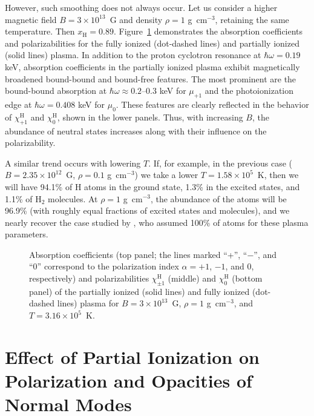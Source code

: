 \documentclass{emulateapj}
\newcommand{\gcc}{\mbox{g cm$^{-3}$}}
\newcommand{\chiH}{\chi^\mathrm{H}}
\newcommand{\xH}{x_\mathrm{H}}
\begin{document}
However, such smoothing does not always occur. Let us consider a higher 
magnetic field $B=3\times10^{13}$~G and density $\rho=1$ \gcc,
retaining the same temperature. Then $\xH=0.89$.
Figure~\ref{fig:kk13a4} demonstrates
the absorption coefficients and polarizabilities for the
fully ionized (dot-dashed lines) and partially ionized
(solid lines) plasma. In addition to the proton cyclotron 
resonance at $\hbar\omega=0.19$ keV,
absorption coefficients in the partially ionized plasma
exhibit magnetically broadened bound-bound
and bound-free features. The most prominent are the bound-bound
absorption at $\hbar\omega\approx0.2$--0.3 keV for $\mu_{+1}$
and the photoionization edge at $\hbar\omega=0.408$ keV for $\mu_0$.
These features are clearly reflected in the behavior of $\chiH_{+1}$
and $\chiH_0$, shown in the lower panels. Thus, with increasing $B$,
the abundance of neutral states increases along with their influence
on the polarizability.

A similar trend occurs with lowering $T$. If, for example,
in the previous case ($B=2.35\times10^{12}$~G, $\rho=0.1$ \gcc)
we take a lower $T=1.58\times10^5$~K, then we will have 
94.1\% of H atoms in the ground state, 1.3\% in the excited states,
and 1.1\% of H$_2$ molecules. At $\rho=1$ \gcc,
the abundance of the atoms will be 96.9\% (with roughly equal
fractions of excited states and molecules), and we
nearly recover the case studied by
\citet{BulikPavlov}, who assumed 100\% of 
atoms for these plasma parameters.

\begin{figure}
\caption{Absorption coefficients (top panel; 
the lines marked ``+'', ``$-$'', and ``0'' correspond to
the polarization
index $\alpha=+1$, $-1$, and $0$, respectively) and
polarizabilities $\chiH_{\pm1}$ (middle) and $\chiH_0$ (bottom panel)
of the partially ionized (solid lines) and fully ionized (dot-dashed lines)
plasma for $B=3\times10^{13}$~G, $\rho=1$ \gcc, and $T=3.16\times10^5$~K.
\label{fig:kk13a4}}
\end{figure}

\section{Effect of Partial Ionization on Polarization and Opacities 
of Normal Modes}
\label{sect:res}
\end{document}
